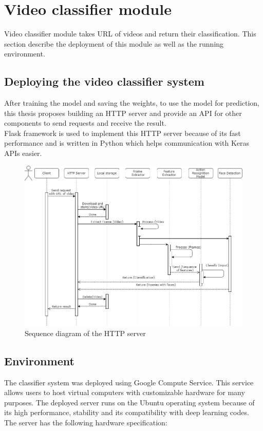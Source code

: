 \section{Video classifier module}
Video classifier module takes URL of videos and return their classification. This section describe the deployment of this module as well as the running environment.
\subsection{Deploying the video classifier system}
After training the model and saving the weights, to use the model for prediction, this thesis proposes building an HTTP server and provide an API for other components to send requests and receive the result. \\
Flask framework is used to implement this HTTP server because of its fast performance and is written in Python which helps communication with Keras APIs easier.
\begin{center}
    \begin{figure}[H]
    \centering
    \includegraphics[width=1\columnwidth]{images/chap4/server_sequence.png}
    \caption{Sequence diagram of the HTTP server}
    \end{figure}
\end{center}
\subsection{Environment}
The classifier system was deployed using Google Compute Service. This service allows users to host virtual computers with customizable hardware for many purposes. The deployed server runs on the Ubuntu operating system because of its high performance, stability and its compatibility with deep learning codes. The server has the following hardware specification:

